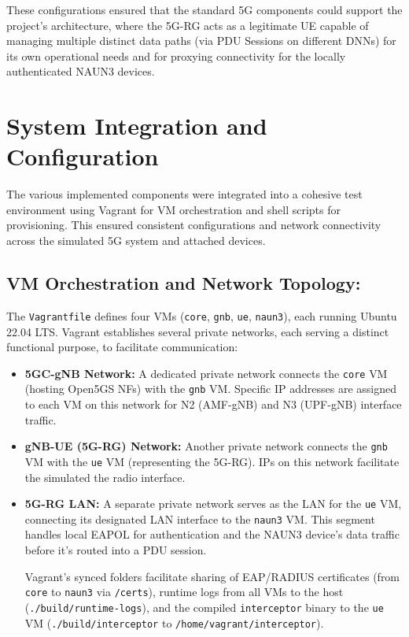 These configurations ensured that the standard \ac{5G} components could support the project's architecture, where the \ac{5G-RG} acts as a legitimate \ac{UE} capable of managing multiple distinct data paths (via \ac{PDU} Sessions on different \acp{DNN}) for its own operational needs and for proxying connectivity for the locally authenticated \ac{NAUN3} devices.

\section{System Integration and Configuration}

The various implemented components were integrated into a cohesive test environment using Vagrant for \ac{VM} orchestration and shell scripts for provisioning. This ensured consistent configurations and network connectivity across the simulated \ac{5G} system and attached devices.

\subsection{\acs{VM} Orchestration and Network Topology:}

The \texttt{Vagrantfile} defines four \acp{VM} (\texttt{core}, \texttt{gnb}, \texttt{ue}, \texttt{naun3}), each running Ubuntu 22.04 LTS. Vagrant establishes several private networks, each serving a distinct functional purpose, to facilitate communication:

\begin{itemize}
    \item \textbf{\ac{5GC}-\ac{gNB} Network:} A dedicated private network connects the \texttt{core} \ac{VM} (hosting Open5GS \acp{NF}) with the \texttt{gnb} \ac{VM}. Specific \ac{IP} addresses are assigned to each \ac{VM} on this network for N2 (\ac{AMF}-\ac{gNB}) and N3 (\ac{UPF}-\ac{gNB}) interface traffic.

    \item \textbf{\ac{gNB}-\ac{UE} (\ac{5G}-\ac{RG}) Network:} Another private network connects the \texttt{gnb} \ac{VM} with the \texttt{ue} \ac{VM} (representing the \ac{5G-RG}). \acp{IP} on this network facilitate the simulated the radio interface.

    \item{ 
        \textbf{\ac{5G-RG} \ac{LAN}:} A separate private network serves as the \ac{LAN} for the \texttt{ue} \ac{VM}, connecting its designated \ac{LAN} interface to the \texttt{naun3} \ac{VM}. This segment handles local \ac{EAPOL} for authentication and the \ac{NAUN3} device's data traffic before it's routed into a \ac{PDU} session.
    
        Vagrant's synced folders facilitate sharing of \ac{EAP}/\ac{RADIUS} certificates (from \texttt{core} to \texttt{naun3} via \texttt{/certs}), runtime logs from all VMs to the host (\texttt{./build/runtime-logs}), and the compiled \texttt{interceptor} binary to the \texttt{ue} \ac{VM} (\texttt{./build/interceptor} to \texttt{/home/vagrant/interceptor}).
    }
\end{itemize}

